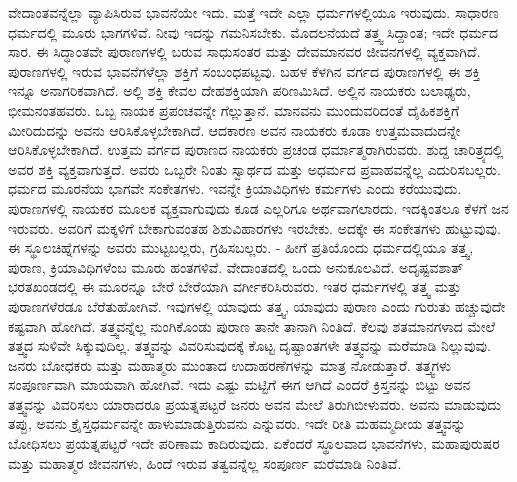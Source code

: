 ವೇದಾಂತವನ್ನೆಲ್ಲಾ ವ್ಯಾಪಿಸಿರುವ ಭಾವನೆಯೇ ಇದು. ಮತ್ತೆ ಇದೇ ಎಲ್ಲಾ ಧರ್ಮಗಳಲ್ಲಿಯೂ ಇರುವುದು. ಸಾಧಾರಣ ಧರ್ಮದಲ್ಲಿ ಮೂರು ಭಾಗಗಳಿವೆ. ನೀವು ಇದನ್ನು ಗಮನಿಸಬೇಕು. ಮೊದಲನೆಯದೆ ತತ್ತ್ವ ಸಿದ್ದಾಂತ; ಇದೇ ಧರ್ಮದ ಸಾರ. ಈ ಸಿದ್ಧಾಂತವೇ ಪುರಾಣಗಳಲ್ಲಿ ಬರುವ ಸಾಧುಸಂತರ ಮತ್ತು ದೇವಮಾನವರ ಜೀವನಗಳಲ್ಲಿ ವ್ಯಕ್ತವಾಗಿದೆ. ಪುರಾಣಗಳಲ್ಲಿ ಇರುವ ಭಾವನೆಗಳೆಲ್ಲಾ ಶಕ್ತಿಗೆ ಸಂಬಂಧಪಟ್ಟವು. ಬಹಳ ಕೆಳಗಿನ ವರ್ಗದ ಪುರಾಣಗಳಲ್ಲಿ ಈ ಶಕ್ತಿ ಇನ್ನೂ ಅನಾಗರಿಕವಾಗಿದೆ. ಅಲ್ಲಿ ಶಕ್ತಿ ಕೇವಲ ದೇಹಶಕ್ತಿಯಾಗಿ ಪರಿಣಮಿಸಿದೆ. ಅಲ್ಲಿನ ನಾಯಕರು ಬಲಾಢ್ಯರು, ಭೀಮನಂತಹವರು. ಒಬ್ಬ ನಾಯಕ ಪ್ರಪಂಚವನ್ನೇ ಗೆಲ್ಲುತ್ತಾನೆ. ಮಾನವನು ಮುಂದುವರಿದಂತೆ ದೈಹಿಕಶಕ್ತಿಗೆ ಮೀರಿದುದನ್ನು ಅವನು ಆರಿಸಿಕೊಳ್ಳಬೇಕಾಗಿದೆ. ಆದಕಾರಣ ಅವನ ನಾಯಕರು ಕೂಡಾ ಉತ್ತಮವಾದುದನ್ನೇ ಆರಿಸಿಕೊಳ್ಳಬೇಕಾಗಿದೆ. ಉತ್ತಮ ವರ್ಗದ ಪುರಾಣದ ನಾಯಕರು ಪ್ರಚಂಡ ಧರ್ಮಾತ್ಮರಾಗಿರುವರು. ಶುದ್ದ ಚಾರಿತ್ರ್ಯದಲ್ಲಿ ಅವರ ಶಕ್ತಿ ವ್ಯಕ್ತವಾಗುತ್ತದೆ. ಅವರು ಒಬ್ಬರೇ ನಿಂತು ಸ್ವಾರ್ಥದ ಮತ್ತು ಅಧರ್ಮದ ಪ್ರವಾಹವನ್ನೆಲ್ಲ ಎದುರಿಸಬಲ್ಲರು. ಧರ್ಮದ ಮೂರನೆಯ ಭಾಗವೇ ಸಂಕೇತಗಳು. ಇವನ್ನೇ ಕ್ರಿಯಾವಿಧಿಗಳು ಕರ್ಮಗಳು ಎಂದು ಕರೆಯುವುದು. ಪುರಾಣಗಳಲ್ಲಿ ನಾಯಕರ ಮೂಲಕ ವ್ಯಕ್ತವಾಗುವುದು ಕೂಡ ಎಲ್ಲರಿಗೂ ಅರ್ಥವಾಗಲಾರದು. ಇದಕ್ಕಿಂತಲೂ ಕೆಳಗೆ ಜನ ಇರುವರು. ಅವರಿಗೆ ಮಕ್ಕಳಿಗೆ ಬೇಕಾಗುವಂತಹ ಶಿಶುವಿಹಾರಗಳು ಇರಬೇಕು. ಅದಕ್ಕೇ ಈ ಸಂಕೇತಗಳು ಹುಟ್ಟುವುವು. ಈ ಸ್ಥೂಲಚಿಹ್ನೆಗಳನ್ನು ಅವರು ಮುಟ್ಟಬಲ್ಲರು, ಗ್ರಹಿಸಬಲ್ಲರು. - ಹೀಗೆ ಪ್ರತಿಯೊಂದು ಧರ್ಮದಲ್ಲಿಯೂ ತತ್ತ್ವ, ಪುರಾಣ, ಕ್ರಿಯಾವಿಧಿಗಳೆಂಬ ಮೂರು ಹಂತಗಳಿವೆ. ವೇದಾಂತದಲ್ಲಿ ಒಂದು ಅನುಕೂಲವಿದೆ. ಅದೃಷ್ಟವಶಾತ್ ಭರತಖಂಡದಲ್ಲಿ ಈ ಮೂರನ್ನೂ ಬೇರೆ ಬೇರೆಯಾಗಿ ವರ್ಗೀಕರಿಸಿರುವರು. ಇತರ ಧರ್ಮಗಳಲ್ಲಿ ತತ್ತ್ವ ಮತ್ತು ಪುರಾಣಗಳೆರಡೂ ಬೆರೆತುಹೋಗಿವೆ. ಇವುಗಳಲ್ಲಿ ಯಾವುದು ತತ್ತ್ವ, ಯಾವುದು ಪುರಾಣ ಎಂದು ಗುರುತು ಹಚ್ಚುವುದೇ ಕಷ್ಟವಾಗಿ ಹೋಗಿದೆ. ತತ್ತ್ವವನ್ನೆಲ್ಲ ನುಂಗಿಕೊಂಡು ಪುರಾಣ ತಾನೇ ತಾನಾಗಿ ನಿಂತಿದೆ. ಕೆಲವು ಶತಮಾನಗಳಾದ ಮೇಲೆ ತತ್ತ್ವದ ಸುಳಿವೇ ಸಿಕ್ಕುವುದಿಲ್ಲ. ತತ್ತ್ವವನ್ನು ವಿವರಿಸುವುದಕ್ಕೆ ಕೊಟ್ಟ ದೃಷ್ಟಾಂತಗಳೇ ತತ್ತ್ವವನ್ನು ಮರೆಮಾಡಿ ನಿಲ್ಲುವುವು. ಜನರು ಬೋಧಕರು ಮತ್ತು ಮಹಾತ್ಮರು ಮುಂತಾದ ಉದಾಹರಣೆಗಳನ್ನು ಮಾತ್ರ ನೋಡುತ್ತಾರೆ. ತತ್ತ್ವಗಳು ಸಂಪೂರ್ಣವಾಗಿ ಮಾಯವಾಗಿ ಹೋಗಿವೆ. ಇದು ಎಷ್ಟು ಮಟ್ಟಿಗೆ ಈಗ ಆಗಿದೆ ಎಂದರೆ ಕ್ರಿಸ್ತನನ್ನು ಬಿಟ್ಟು ಅವನ ತತ್ತ್ವವನ್ನು ವಿವರಿಸಲು ಯಾರಾದರೂ ಪ್ರಯತ್ನಪಟ್ಟರೆ ಜನರು ಅವನ ಮೇಲೆ ತಿರುಗಿಬೀಳುವರು. ಅವನು ಮಾಡುವುದು ತಪ್ಪು, ಅವನು ಕ್ರೈಸ್ತಧರ್ಮವನ್ನೇ ಹಾಳುಮಾಡುತ್ತಿರುವನು ಎನ್ನುವರು. ಇದೇ ರೀತಿ ಮಹಮ್ಮದೀಯ ತತ್ತ್ವವನ್ನು ಬೋಧಿಸಲು ಪ್ರಯತ್ನಪಟ್ಟರೆ ಇದೇ ಪರಿಣಾಮ ಕಾದಿರುವುದು. ಏಕೆಂದರೆ ಸ್ಥೂಲವಾದ ಭಾವನೆಗಳು, ಮಹಾಪುರುಷರ ಮತ್ತು ಮಹಾತ್ಮರ ಜೀವನಗಳು, ಹಿಂದೆ ಇರುವ ತತ್ವವನ್ನೆಲ್ಲ ಸಂಪೂರ್ಣ ಮರೆಮಾಡಿ ನಿಂತಿವೆ.

